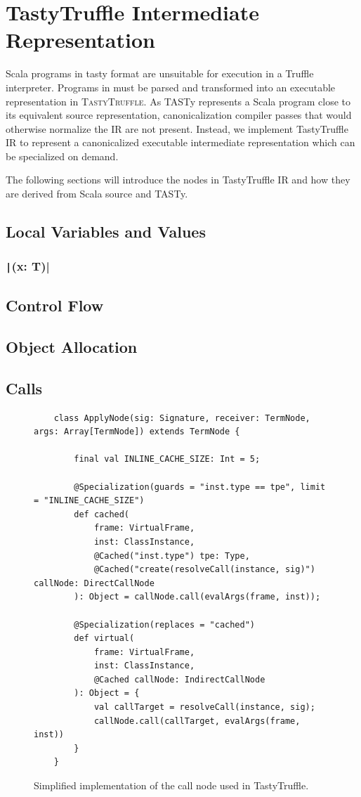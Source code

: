 \section{TastyTruffle Intermediate Representation}

Scala programs in \acrshort{tasty} format are unsuitable for execution in a Truffle interpreter. Programs in must be parsed and transformed into an executable representation in \textsc{TastyTruffle}. As TASTy represents a Scala program close to its equivalent source representation, canonicalization compiler passes that would otherwise normalize the IR are not present. Instead, we implement TastyTruffle IR to represent a canonicalized executable intermediate representation which can be specialized on demand. 


The following sections will introduce the nodes in TastyTruffle IR and how they are derived from Scala source and TASTy.


\subsection*{Local Variables and Values}

\subsubsection{\texttt|(x: T)|}

\subsection*{Control Flow}

\subsection*{Object Allocation}

\subsection*{Calls}

\begin{figure}[H]
	\begin{verbatim}
	class ApplyNode(sig: Signature, receiver: TermNode, args: Array[TermNode]) extends TermNode {
		
		final val INLINE_CACHE_SIZE: Int = 5;
		
		@Specialization(guards = "inst.type == tpe", limit = "INLINE_CACHE_SIZE")
		def cached(
			frame: VirtualFrame,
			inst: ClassInstance,
			@Cached("inst.type") tpe: Type,
			@Cached("create(resolveCall(instance, sig)") callNode: DirectCallNode
		): Object = callNode.call(evalArgs(frame, inst));
		
		@Specialization(replaces = "cached")
		def virtual(
			frame: VirtualFrame,
			inst: ClassInstance,
			@Cached callNode: IndirectCallNode
		): Object = {
			val callTarget = resolveCall(instance, sig);
			callNode.call(callTarget, evalArgs(frame, inst))
		}
	}
	\end{verbatim}
	\caption{Simplified implementation of the call node used in TastyTruffle.}
\end{figure}

